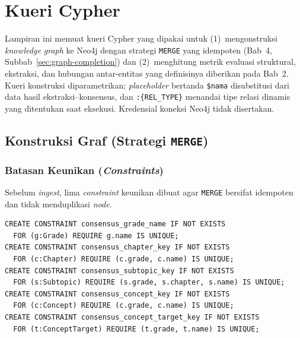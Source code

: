 \documentclass[main]{subfiles}
\begin{document}
\ifSubfilesClassLoaded{}{\appendix\setcounter{chapter}{5}}

\chapter{Kueri Cypher}
\label{lamp:cypher}

Lampiran ini memuat kueri Cypher yang dipakai untuk (1)~mengonstruksi
\textit{knowledge graph} ke Neo4j dengan strategi \texttt{MERGE} yang idempoten
(Bab~4, Subbab~\ref{sec:graph-completion}) dan (2)~menghitung metrik evaluasi
struktural, ekstraksi, dan hubungan antar-entitas yang definisinya diberikan
pada Bab~2. Kueri konstruksi diparametrikan; \textit{placeholder} bertanda
\texttt{\$nama} disubstitusi dari data hasil ekstraksi--konsensus, dan
\texttt{:\{REL\_TYPE\}} menandai tipe relasi dinamis yang ditentukan saat
eksekusi. Kredensial koneksi Neo4j tidak disertakan.

\section{Konstruksi Graf (Strategi \texttt{MERGE})}
\label{lamp:cypher-konstruksi}

\subsection{Batasan Keunikan (\textit{Constraints})}

Sebelum \textit{ingest}, lima \textit{constraint} keunikan dibuat agar
\texttt{MERGE} bersifat idempoten dan tidak menduplikasi \textit{node}.

\begin{lstlisting}[style=cypherbox,caption={Constraint keunikan node.},label={lst:cypher-constraint}]
CREATE CONSTRAINT consensus_grade_name IF NOT EXISTS
  FOR (g:Grade) REQUIRE g.name IS UNIQUE;
CREATE CONSTRAINT consensus_chapter_key IF NOT EXISTS
  FOR (c:Chapter) REQUIRE (c.grade, c.name) IS UNIQUE;
CREATE CONSTRAINT consensus_subtopic_key IF NOT EXISTS
  FOR (s:Subtopic) REQUIRE (s.grade, s.chapter, s.name) IS UNIQUE;
CREATE CONSTRAINT consensus_concept_key IF NOT EXISTS
  FOR (c:Concept) REQUIRE (c.grade, c.name) IS UNIQUE;
CREATE CONSTRAINT consensus_concept_target_key IF NOT EXISTS
  FOR (t:ConceptTarget) REQUIRE (t.grade, t.name) IS UNIQUE;
\end{lstlisting}
\end{document}
